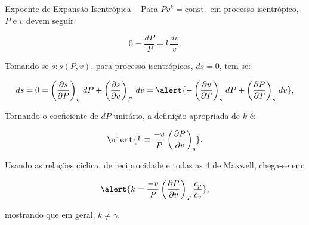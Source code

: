     \begin{frame}[allowframebreaks]{Expoente de Expansão Isentrópica --}\vspace*{-0em}
        Para \alert{$Pv^k = \mbox{const.}$}~em processo isentrópico, \alert{$P$} e \alert{$v$}
        devem seguir:

        \begin{equation*}
            0 = \frac{dP}{P} + k\frac{dv}{v}.
        \end{equation*}

        Tomando-se \alert{$s\!:\!s(P, v)$}, para processo isentrópicos, \alert{$ds = 0$},
        tem-se:

        \begin{equation*}
            ds = 0 =
                \left(
                    \frac{\partial s}{\partial P}
                \right)_v\,dP +
                \left(
                    \frac{\partial s}{\partial v}
                \right)_P\,dv = \alert{
                -\left(
                    \frac{\partial v}{\partial T}
                \right)_s\,dP +
                \left(
                    \frac{\partial P}{\partial T}
                \right)_s\,dv
            },
        \end{equation*}

        \pagebreak
        Tornando o coeficiente de \alert{$dP$} unitário, a definição apropriada de \alert{$k$}
        é:

        \begin{equation*}
            \alert{
                k \equiv
                    \frac{-v}{P}
                    \left(
                        \frac{\partial P}{\partial v}
                    \right)_s
            }.
        \end{equation*}\vspace*\medskipamount

        Usando as relações \alert{cíclica}, de \alert{reciprocidade} e todas as \alert{4 de
        Maxwell}, chega-se em:

        \begin{equation*}
            \alert{
                k =
                    \frac{-v}{P}
                    \left(
                        \frac{\partial P}{\partial v}
                    \right)_T
                    \frac{c_p}{c_v}
            },
        \end{equation*}

        \noindent mostrando que \alert{em geral, $k \neq \gamma$}.


\end{frame}
